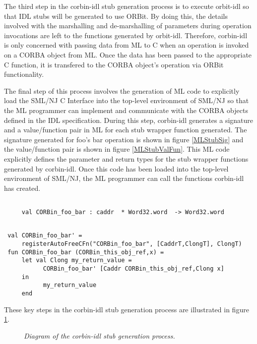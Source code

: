 The third step in the corbin-idl stub generation process is to execute 
orbit-idl so that IDL stubs will be generated to use ORBit.  By doing this,
the details involved with the marshalling and de-marshalling of 
parameters during operation invocations are left to the functions generated
by orbit-idl.  Therefore, corbin-idl is only concerned with passing data 
from ML to C when an operation is invoked on a CORBA object from ML. 
Once the data has been passed to the appropriate C function, it is transfered
to the CORBA object's operation via ORBit functionality.   

The final step of this process involves the generation of ML code to 
explicitly load the SML/NJ C Interface into the top-level environment 
of SML/NJ so that the ML programmer can implement and communicate with the 
CORBA objects defined in the IDL specification.   During this step, corbin-idl
generates a signature and a value/function pair in ML for each stub wrapper
function generated.  The signature generated for foo's bar operation is shown
in figure \ref{MLStubSig} and the value/function pair is shown in figure 
\ref{MLStubValFun}.  This ML code explicitly defines the parameter and return
types for the stub wrapper functions generated by corbin-idl.   
Once this code has been loaded into the top-level environment of SML/NJ, 
the ML programmer can call the functions corbin-idl has created.  
\begin{figure*}[t]
\singlespace
\begin{verbatim}

     val CORBin_foo_bar : caddr  * Word32.word  -> Word32.word

\end{verbatim}
\doublespace
\caption {\em{ML signature for the CORBin\_foo\_bar function}.}
\figline
        \label{MLStubSig}
\end{figure*}
\begin{figure*}[t]
\singlespace
\begin{verbatim}

 val CORBin_foo_bar' =
     registerAutoFreeCFn("CORBin_foo_bar", [CaddrT,ClongT], ClongT)
 fun CORBin_foo_bar (CORBin_this_obj_ref,x) =
     let val Clong my_return_value = 
           CORBin_foo_bar' [Caddr CORBin_this_obj_ref,Clong x] 
     in  
           my_return_value  
     end

\end{verbatim}
\doublespace
\caption {\em{ML value/function pair for the CORBin\_foo\_bar operation}.}
\figline
        \label{MLStubValFun}
\end{figure*}
These key steps in the corbin-idl stub generation process are illustrated 
in figure \ref{corbinIDLStubs}. 
\begin{figure}
\begin{center}
\leavevmode
\caption{\em{Diagram of the corbin-idl stub generation process}.}
\figline
         \label{corbinIDLStubs}
\end{center}
\end{figure}

